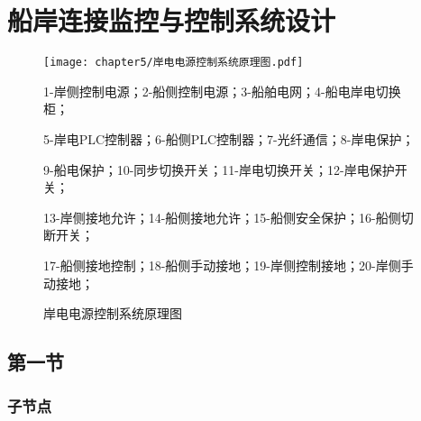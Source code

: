 \chapter{船岸连接监控与控制系统设计}

\begin{figure}[!htp]
	\centering
	\texttt{[image: chapter5/岸电电源控制系统原理图.pdf]}
	\caption{岸电电源控制系统原理图}
	\label{fig:岸电电源控制系统原理图}
    {\kaishu {}
    \hspace*{\fill} 

    1-岸侧控制电源；2-船侧控制电源；3-船舶电网；4-船电岸电切换柜；

    5-岸电PLC控制器；6-船侧PLC控制器；7-光纤通信；8-岸电保护；

    9-船电保护；10-同步切换开关；11-岸电切换开关；12-岸电保护开关；
    
    13-岸侧接地允许；14-船侧接地允许；15-船侧安全保护；16-船侧切断开关；

    17-船侧接地控制；18-船侧手动接地；19-岸侧控制接地；20-岸侧手动接地；

    }
\end{figure}

\section{第一节}

\subsection{子节点}